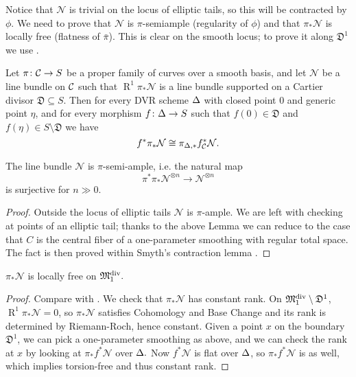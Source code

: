 Notice that $\mathcal N$ is trivial on the locus of elliptic tails, so this will be contracted by $\phi$. We need to prove that $\mathcal N$ is $\pi$-semiample (regularity of $\phi$) and that $\pi_*\mathcal N$ is locally free (flatness of $\bar{\pi}$). This is clear on the smooth locus; to prove it along $\mathfrak D^1$ we use \cite[Lemmma~3.7.2.2]{RSPW}.
\begin{lem}\label{DVR}
Let $\pi\colon\mathcal{C}\rightarrow S$ be a proper family of curves over a smooth basis, and let $\mathcal N$ be a line bundle on $\mathcal{C}$ such that $\operatorname{R}^1\pi_*\mathcal N$ is a line bundle supported on a Cartier divisor $\mathfrak D\subseteq S$. Then for every DVR scheme $\Delta$ with closed point $0$ and generic point $\eta$, and for every morphism $f\colon \Delta\rightarrow S$ such that $f(0)\in\mathfrak D$ and $f(\eta)\in S\setminus\mathfrak D$ we have
\[f^*\pi_*\mathcal N\cong \pi_{\Delta,*}f_{\mathcal{C}}^*\mathcal N.\]
\end{lem}

\begin{lem}\label{lemma:semiample}
The line bundle $\mathcal N$ is $\pi$-semi-ample, i.e. the natural map
\[\pi^*\pi_*\mathcal N^{\otimes n}\to \mathcal N^{\otimes n}\]
is surjective for $n\gg 0$.
\end{lem}
\begin{proof}
Outside the locus of elliptic tails $\mathcal N$ is $\pi$-ample. We are left with checking at points of an elliptic tail; thanks to the above Lemma we can reduce to the case that $C$ is the central fiber of a one-parameter smoothing with regular total space. The fact is then proved within Smyth's contraction lemma \cite[Lemma~2.12]{SMY1}.
\end{proof}

\begin{lem}
$\pi_*\mathcal N$ is locally free on $\mathfrak M_1^{\rm{div}}.$
\end{lem}
\begin{proof} Compare with \cite[Proposition~3.7.2.1]{RSPW}.
We check that $\pi_*\mathcal N$ has constant rank.
On $\mathfrak M_1^{\rm{div}}\setminus \mathfrak{D}^1$, $\operatorname{R}^1\pi_*\mathcal N=0$, so $\pi_*\mathcal N$ satisfies Cohomology and Base Change \cite[Theorem III.12.11]{HAR} and its rank is determined by Riemann-Roch, hence constant.
Given a point $x$ on the boundary $\mathfrak{D}^1$, we can pick a one-parameter smoothing as above, and we can check the rank at $x$ by looking at $\pi_*f^*\mathcal N$ over $\Delta.$ Now $f^*\mathcal N$ is flat over $\Delta$, so $\pi_*f^*\mathcal N$ is as well, which implies torsion-free and thus constant rank.
\end{proof}

